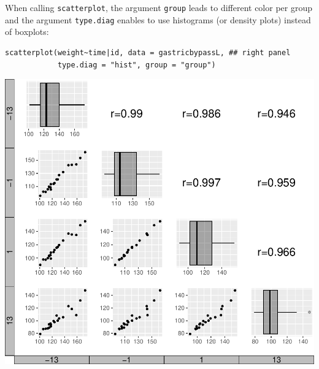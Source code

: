 \documentclass[12pt]{article}
\begin{document}
When calling \texttt{scatterplot}, the argument \texttt{group} leads to different
color per group and the argument \texttt{type.diag} enables to use histograms
(or density plots) instead of boxplots:
\lstset{language=r,label= ,caption= ,captionpos=b,numbers=none}
\begin{lstlisting}
scatterplot(weight~time|id, data = gastricbypassL, ## right panel
            type.diag = "hist", group = "group")
\end{lstlisting}


\bigskip

\begin{minipage}{0.48\linewidth}
\begin{center}
\includegraphics[trim={0 0 0 0},width=\textwidth]{./figures/scatterplot.pdf}
\end{center}
\end{minipage}
\end{document}
